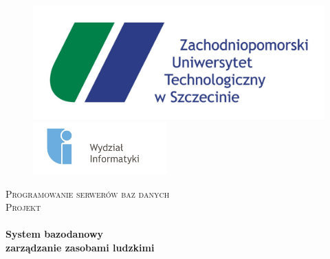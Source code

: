 \begin{titlepage}
\begin{center}


\begin{figure}[ht]
\begin{minipage}[b]{0.45\linewidth}
\centering
\includegraphics[width=\textwidth]{zut_logo}

\end{minipage}
\hspace{0.5cm}
\begin{minipage}[b]{0.45\linewidth}
\centering
\includegraphics[width=\textwidth,height=2cm]{wi_logo}

\end{minipage}
\end{figure}

\textsc{\LARGE Programowanie serwerów baz danych}\\[1.5cm]

\textsc{\Large Projekt}\\[0.5cm]

\HRule \\[0.4cm]
{ \huge \bfseries System bazodanowy\\ zarządzanie zasobami ludzkimi}\\[0.4cm]

\HRule \\[1.5cm]



\end{center}
\end{titlepage}
